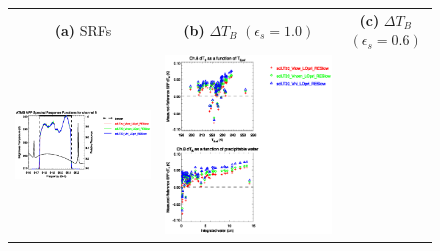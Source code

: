 \begin{figure}[H]
  \centering
  \begin{tabular}{c c c}
    \textsf{\textbf{(a)} SRFs} &
    \textsf{\textbf{(b)} $\Delta T_B$ $(\epsilon_s = 1.0)$} &
    \textsf{\textbf{(c)} $\Delta T_B$ $(\epsilon_s = 0.6)$} \\
    \includegraphics[bb=80 400 280 558,clip,scale=0.85]{graphics/srf/Vset/atms_npp.ch8.osrf.eps} &
    \includegraphics[bb=85 400 260 558,clip,scale=0.85]{graphics/dtb/Vset/e1.0_r0.0/atms_npp.ch8.dTb.eps} & 

\end{tabular}
\end{figure}

